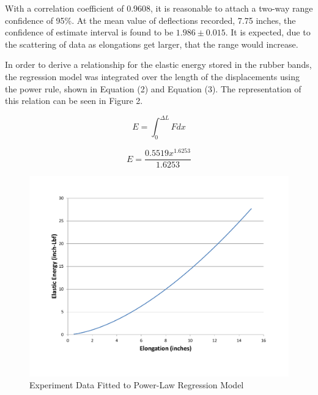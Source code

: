 \documentclass[12pt]{article}
\begin{document}
\bigskip
With a correlation coefficient of 0.9608, it is reasonable to attach a two-way range confidence of 95\%. At the mean value of deflections recorded, 7.75 inches, the confidence of estimate interval is found to be $1.986 \pm 0.015$. It is expected, due to the scattering of data as elongations get larger, that the range would increase.
\bigskip

In order to derive a relationship for the elastic energy stored in the rubber bands, the regression model was integrated over the length of the displacements using the power rule, shown in Equation (2) and Equation (3). The representation of this relation can be seen in Figure 2.
\bigskip

\begin{equation}
E = \int_{0}^{\Delta L}Fdx
\end{equation}

\bigskip

\begin{equation}
E = \frac{0.5519x^{1.6253}}{1.6253}
\end{equation}

\newpage

\begin{figure}[t!] %
   \centering
   \includegraphics[width=\linewidth]{elastic_energy.pdf} 
   \caption{Experiment Data Fitted to Power-Law Regression Model}
   \label{fig:example}
\end{figure}

\bigskip
\end{document}
